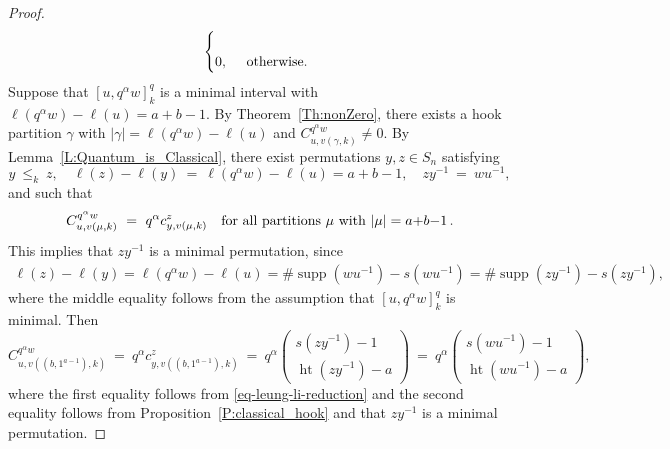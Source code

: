 \documentclass[11pt]{article}
\theoremstyle{definition}
\numberwithin{equation}{section}
\DeclareMathOperator{\het}{ht}
\DeclareMathOperator{\supp}{supp}
\begin{document}
\begin{proof}
\begin{equation*}
\begin{cases}
            \\
            0, &
            \begin{array}[t]{lr}
                \text{otherwise.}
            \end{array}
        \end{cases}
    \end{equation*}
    Suppose that $[u, q^{\alpha}w]_k^q$ is a minimal interval
    with $\ell(q^\alpha w) - \ell(u) = a{+}b{-}1$.
    By Theorem~\ref{Th:nonZero},
    there exists a hook partition $\gamma$
    with $|\gamma| = \ell(q^\alpha w) - \ell(u)$
    and $C^{q^\alpha w}_{u,v(\gamma,k)} \neq 0$.
    By Lemma~\ref{L:Quantum_is_Classical},
    there exist permutations $y, z \in S_n$ satisfying
    \begin{equation}
        \label{properties-of-y-and-z}
        y\ \leq_k\ z,
        \quad
        \ell(z) - \ell(y)\ =\ \ell(q^\alpha w) - \ell(u) = a{+}b{-}1,
        \quad
        zy^{-1}\ =\ wu^{-1},
    \end{equation}
    and such that
    \begin{equation}
        \label{eq-leung-li-reduction}
        C^{q^\alpha w}_{u,v(\mu,k)}\ =\  q^\alpha c^z_{y,v(\mu,k)}
        \quad \text{for all partitions $\mu$ with $|\mu| = a{+}b{-}1$\,.}
    \end{equation}
    This implies that $z y^{-1}$ is a minimal permutation, since
    \begin{align*}
        \ell(z) - \ell(y)
        = \ell(q^\alpha w) - \ell(u)
        = \#\supp(w u^{-1}) - s(w u^{-1})
        = \#\supp(z y^{-1}) - s(z y^{-1}),
    \end{align*}
    where the middle equality follows from the assumption that
    $[u, q^{\alpha}w]_k^q$ is minimal.
    Then
    \begin{equation}
        C^{q^\alpha w}_{u,v((b, 1^{a-1}),k)}
        \ =\ q^\alpha c^z_{y,v((b, 1^{a-1}),k)}
        \ =\ q^\alpha \left(\begin{smallmatrix} s(zy^{-1})-1 \\ \het(zy^{-1})-a \end{smallmatrix}\right)
        \ =\ q^\alpha \left(\begin{smallmatrix} s(wu^{-1})-1 \\ \het(wu^{-1})-a \end{smallmatrix}\right),
    \end{equation}
    where the first equality follows from \eqref{eq-leung-li-reduction}
    and the second equality follows from Proposition~\ref{P:classical_hook}
    and that $z y^{-1}$ is a minimal permutation.


\end{proof}
\end{document}
